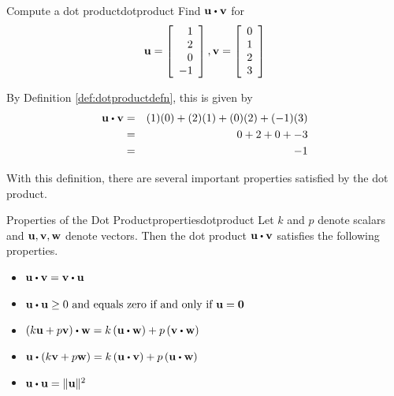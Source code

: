 \begin{example}{Compute a dot product}{dotproduct}
Find $\vect{u} \dotprod \vect{v}$ for
\begin{equation*}
{\bf u}
=
\left[ 
\begin{array}{r}
1 \\
2 \\
0 \\
-1 
\end{array}
\right],
{\bf v}
=
\left[ 
\begin{array}{r}
0 \\
1 \\
2 \\
3
\end{array}
\right] 
\end{equation*}
\end{example}

\begin{solution}
By Definition \ref{def:dotproductdefn}, this is given by 
\begin{eqnarray*}
\vect{u} \dotprod \vect{v}
&=&
(1)(0) + (2)(1) + (0)(2) + (-1)(3) \\
&=&
0 + 2 + 0 + -3 \\
&=&
-1
\end{eqnarray*}
\end{solution}

With this definition, there are several important properties satisfied
by the dot product.

\begin{proposition}{Properties of the Dot Product}{propertiesdotproduct}
Let $k $ and $p $  denote scalars and ${\bf u},{\bf v},{\bf w}$ denote vectors.
Then the dot product $\vect{u} \dotprod \vect{v}$ satisfies the following properties.
\begin{itemize}
\item
$\vect{u}\dotprod \vect{v}= \vect{v}\dotprod \vect{u} $
\item
$\vect{u}\dotprod \vect{u}\geq 0 \text{ and equals zero if and only if }\vect{u}=\vect{0}$
\item
$\left( k\vect{u}+p\vect{v}\right) \dotprod \vect{w}=k\left( \vect{u}\dotprod \vect{w}\right) +p\left( \vect{v}\dotprod \vect{w}\right)$
\item
$\vect{u}\dotprod\left( k\vect{v}+p\vect{w}\right) =k\left(
\vect{u}\dotprod \vect{v}\right) +p\left( \vect{u}\dotprod \vect{w}\right)$
\item
$\vect{u}\dotprod \vect{u}=\vectlength \vect{u}\vectlength ^{2} $
\end{itemize}
\end{proposition}

